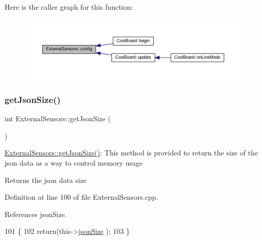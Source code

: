 Here is the caller graph for this function\+:
\nopagebreak
\begin{figure}[H]
\begin{center}
\leavevmode
\includegraphics[width=350pt]{classExternalSensors_a862a4bd11346b37270d0244c2adabe5a_icgraph}
\end{center}
\end{figure}
\mbox{\label{classExternalSensors_a8e3a93efa8f5a0477f300e26084b6625}} 
\subsubsection{\texorpdfstring{get\+Json\+Size()}{getJsonSize()}}
{\footnotesize\ttfamily int External\+Sensors\+::get\+Json\+Size (\begin{DoxyParamCaption}{ }\end{DoxyParamCaption})}

\hyperlink{classExternalSensors_a8e3a93efa8f5a0477f300e26084b6625}{External\+Sensors\+::get\+Json\+Size()}\+: This method is provided to return the size of the json data as a way to control memory usage

\begin{DoxyReturn}{Returns}
the json data size 
\end{DoxyReturn}


Definition at line 100 of file External\+Sensors.\+cpp.



References json\+Size.


\begin{DoxyCode}
101 \{
102     \textcolor{keywordflow}{return}(this->\hyperlink{classExternalSensors_acacea86d74d967b57fcff282d26cff57}{jsonSize} );
103 \}
\end{DoxyCode}
\mbox{\label{classExternalSensors_a78c2bf55084435dd51d3c559b2d3c6f3}} 
